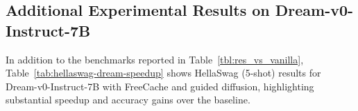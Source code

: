 \subsection{Additional Experimental Results on Dream-v0-Instruct-7B}

In addition to the benchmarks reported in Table~\ref{tbl:res_vs_vanilla}, Table~\ref{tab:hellaswag-dream-speedup} shows HellaSwag (5-shot) results for Dream-v0-Instruct-7B with FreeCache and guided diffusion, highlighting substantial speedup and accuracy gains over the baseline.

\begin{table}[H]
\centering
\caption{HellaSwag accuracy, latency, and speedup relative to the Dream-v0-Instruct-7B Baseline.}
\vspace{0.2em}
\label{tab:hellaswag-dream-speedup}
\end{table}

